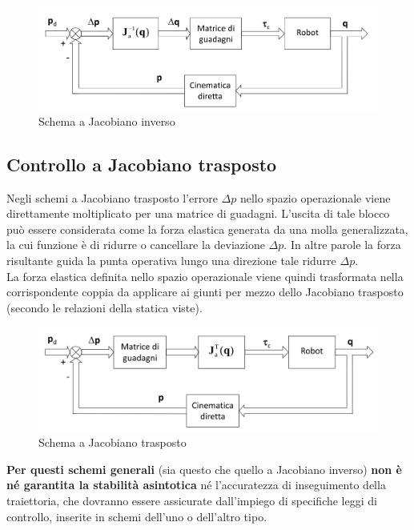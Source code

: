\begin{figure}[H]
	\centering
	\includegraphics[width=0.7\linewidth]{images/operational_space_control_inv_jac}
	\caption{Schema a Jacobiano inverso}
	\label{fig:operationalspacecontrolinvjac}
\end{figure}







\subsection{Controllo a Jacobiano trasposto}
Negli schemi a Jacobiano trasposto l’errore $\Delta p$ nello spazio operazionale viene direttamente moltiplicato per una matrice di guadagni.
L’uscita di tale blocco può essere considerata come la forza elastica generata da una molla generalizzata, la cui funzione è di ridurre o cancellare la deviazione $\Delta p$. In altre parole la forza risultante guida la punta operativa lungo una direzione tale ridurre $\Delta p$.\\
La forza elastica definita nello spazio operazionale viene quindi trasformata nella corrispondente coppia da applicare ai giunti per mezzo dello Jacobiano trasposto (secondo le relazioni della statica viste).

\begin{figure}[H]
	\centering
	\includegraphics[width=0.7\linewidth]{images/operational_space_control_jac_trasp}
	\caption{Schema a Jacobiano trasposto}
	\label{fig:operationalspacecontroljactrasp}
\end{figure}


\textbf{Per questi schemi generali} (sia questo che quello a Jacobiano inverso) \textbf{non è né garantita la stabilità asintotica} né l’accuratezza di inseguimento della traiettoria, che dovranno essere assicurate dall’impiego di specifiche leggi di controllo, inserite in schemi dell’uno o dell’altro tipo.






